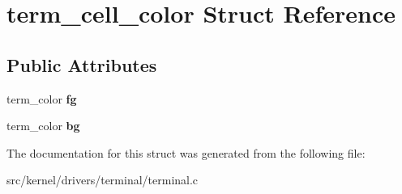\hypertarget{structterm__cell__color}{}\section{term\+\_\+cell\+\_\+color Struct Reference}
\label{structterm__cell__color}
\subsection*{Public Attributes}
\begin{DoxyCompactItemize}
\item 
\mbox{\label{structterm__cell__color_a186530d74322134d8ffc9ee611444ec3}} 
term\+\_\+color {\bfseries fg}
\item 
\mbox{\label{structterm__cell__color_a2cb1bf76296ac4924b47505281b459cb}} 
term\+\_\+color {\bfseries bg}
\end{DoxyCompactItemize}


The documentation for this struct was generated from the following file\+:\begin{DoxyCompactItemize}
\item 
src/kernel/drivers/terminal/terminal.\+c\end{DoxyCompactItemize}
